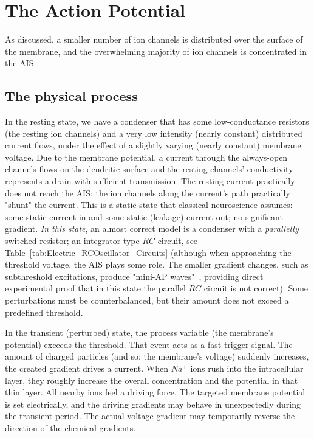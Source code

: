 
\section{The Action Potential\label{sec:ActionPotential}}

As discussed, a smaller number of ion channels is distributed over the surface of the membrane, and the overwhelming majority of ion channels is concentrated in the \gls{AIS}.


\subsection{The physical process\label{sec:AP-PhysicalProcess}}

In the resting state, we have a condenser that has some low-conductance resistors (the resting ion channels) and a very low intensity (nearly constant) distributed current flows, under the effect of a slightly varying (nearly constant) membrane voltage. Due to the membrane potential, a current through the always-open channels flows on the dendritic surface
and the resting channels' conductivity represents a drain with 
sufficient transmission. The resting current practically does not 
reach the \gls{AIS}: the ion channels along the current's path
practically "shunt" the current.
This is a static state that classical neuroscience assumes: some static current in and some static (leakage) current out; no significant gradient.
\textit{In this state}, an almost correct model is a condenser with a
\textit{parallelly} switched resistor; an integrator-type  $RC$ circuit, see Table~\ref{tab:Electric_RCOscillator_Circuits}
(although when approaching the threshold voltage, the \gls{AIS} plays some role. The smaller gradient changes, such as subthreshold excitations, produce "mini-\gls{AP} waves"~\cite{NeuralEnergyConsumption:2017}, providing direct experimental proof that in this state the parallel $RC$ circuit is not correct).
Some perturbations must be counterbalanced, but their
amount does not exceed a predefined threshold.

In the transient (perturbed) state, the process variable
(the membrane's potential) exceeds the threshold. That event acts
as a fast trigger signal. The amount of charged particles (and so:
the membrane's voltage) suddenly increases, the created gradient
drives a current.
When $Na^+$ ions rush into the intracellular layer, they roughly increase the overall concentration and the potential in that thin layer.
All nearby ions feel a driving force. The targeted membrane potential is set electrically,
and the driving gradients may behave in unexpectedly during the transient period.
The actual voltage gradient may temporarily reverse the direction of the chemical gradients.

